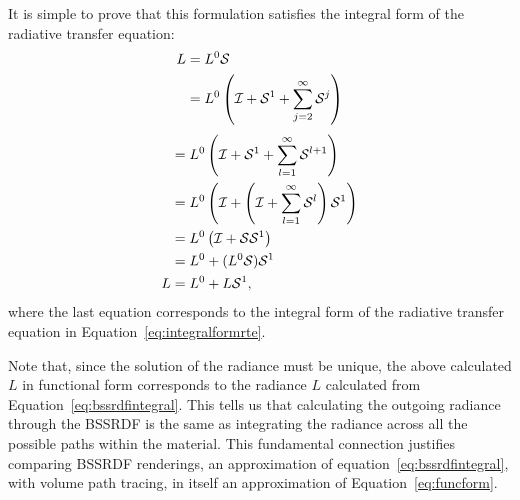 It is simple to prove that this formulation satisfies the integral form of the radiative transfer equation:
\begin{equation*}
\begin{split}
L &= L^0 \mathcal{S} \\
&= L^0 \left(\mathcal{I} + \mathcal{S}^1 + \sum_{j=2}^\infty \mathcal{S}^j \right) \\
\end{split}
\end{equation*}
\begin{equation*}
\begin{split}
&= L^0 \left( \mathcal{I} + \mathcal{S}^1 + \sum_{l=1}^\infty \mathcal{S}^{l+1} \right) \\
&= L^0 \left( \mathcal{I} + \left( \mathcal{I} + \sum_{l=1}^\infty \mathcal{S}^l \right) \mathcal{S}^1 \right)  \\
&= L^0 \left( \mathcal{I} + \mathcal{S} \mathcal{S}^1 \right)  \\
&= L^0 + (L^0 \mathcal{S}) \mathcal{S}^1   \\
L &= L^0 + L \mathcal{S}^1,   \\
\end{split}
\end{equation*}
where the last equation corresponds to the integral form of the radiative transfer equation in Equation~\ref{eq:integralformrte}.

Note that, since the solution of the radiance must be unique, the above calculated $L$ in functional form corresponds to the radiance $L$ calculated from Equation~\ref{eq:bssrdfintegral}. This tells us that calculating the outgoing radiance through the BSSRDF is the same as integrating the radiance across all the possible paths within the material. This fundamental connection justifies comparing BSSRDF renderings, an approximation of equation~\ref{eq:bssrdfintegral}, with volume path tracing, in itself an approximation of Equation~\ref{eq:funcform}.

